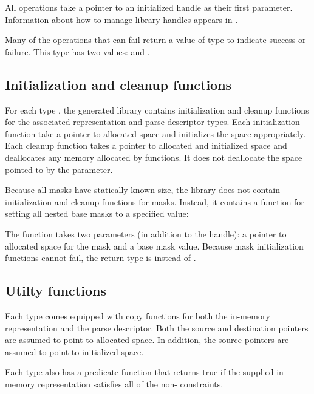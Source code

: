 All operations take a pointer to an
initialized \pads{} handle as their first parameter.  Information
about how to manage \pads{} library handles appears in
. 

Many of the operations that can fail return a value of type
 to indicate success or failure.  This type has two
values:  and . 


\subsection{Initialization and cleanup functions}
For each type , the generated library contains
initialization and cleanup functions for the associated representation
 and parse descriptor  types.  Each initialization
function take a pointer to allocated space and initializes the space
appropriately.  Each cleanup function takes a pointer to allocated and
initialized space and deallocates any memory allocated by \pads{} functions.
It does not deallocate the space pointed to by the parameter.  


Because all masks have statically-known size, the library does not
contain initialization and cleanup functions for masks.  
Instead, it contains a function for setting all nested base masks 
to a specified value:  


The function takes two parameters (in
addition to the \pads{} handle): a pointer to allocated space for the
mask and a base mask value.  Because mask initialization
functions cannot fail, the return type is  instead of
. 

\subsection{Utilty functions}
Each type  comes equipped with copy functions for both the
in-memory representation and the parse descriptor.  Both the source
and destination pointers are assumed to point to allocated space.  In
addition, the source pointers are assumed to point to initialized
space.


\noindent
Each type  also has a predicate function that returns true if
the supplied in-memory representation satisfies all of the
non-\pparsecheck{} constraints.

